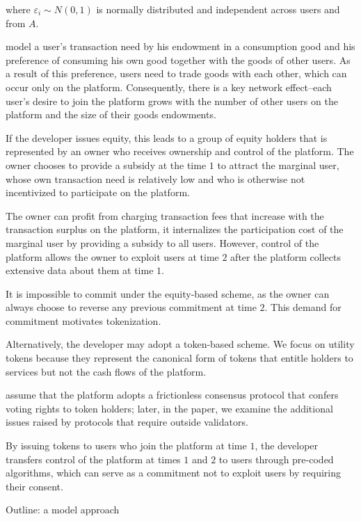         where $\varepsilon_{i} \sim{} N(0, 1)$ is normally distributed and independent across users and from $A$.


        model a user's transaction need by his endowment in a consumption good and his preference of consuming his own good together with the goods of other users. As a result of this preference, users need to trade goods with each other, which can occur only on the platform. Consequently, there is a key network effect--each user's desire to join the platform grows with the number of other users on the platform and the size of their goods endowments.

        If the developer issues equity, this leads to a group of equity holders that is represented by an owner who receives ownership and control of the platform. The owner chooses to provide a subsidy at the time $1$ to attract the marginal user, whose own transaction need is relatively low and who is otherwise not incentivized to participate on the platform.

        The owner can profit from charging transaction fees that increase with the transaction surplus on the platform, it internalizes the participation cost of the marginal user by providing a subsidy to all users. However, control of the platform allows the owner to exploit users at time $2$ after the platform collects extensive data about them at time $1$.

        It is impossible to commit under the equity-based scheme, as the owner can always choose to reverse any previous commitment at time $2$. This demand for commitment motivates tokenization.

        Alternatively, the developer may adopt a token-based scheme. We focus on utility tokens because they represent the canonical form of tokens that entitle holders to services but not the cash flows of the platform.

        assume that the platform adopts a frictionless consensus protocol that confers voting rights to token holders; later, in the paper, we examine the additional issues raised by protocols that require outside validators.

        By issuing tokens to users who join the platform at time $1$, the developer transfers control of the platform at times $1$ and $2$ to users through pre-coded algorithms, which can serve as a commitment not to exploit users by requiring their consent.

        Outline: a model approach

